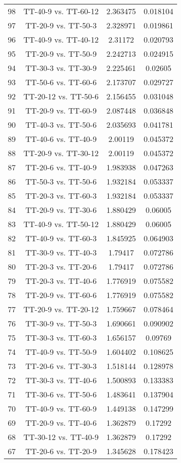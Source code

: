 \documentclass[a4paper,10pt]{article}
\begin{document}
\begin{landscape}
\begin{table}[!htp]
\begin{tabular}{cccc}
98&TT-40-9 vs. TT-60-12&2.363475&0.018104\\
97&TT-20-9 vs. TT-50-3&2.328971&0.019861\\
96&TT-40-9 vs. TT-40-12&2.31172&0.020793\\
95&TT-20-9 vs. TT-50-9&2.242713&0.024915\\
94&TT-30-3 vs. TT-30-9&2.225461&0.02605\\
93&TT-50-6 vs. TT-60-6&2.173707&0.029727\\
92&TT-20-12 vs. TT-50-6&2.156455&0.031048\\
91&TT-20-9 vs. TT-60-9&2.087448&0.036848\\
90&TT-40-3 vs. TT-50-6&2.035693&0.041781\\
89&TT-40-6 vs. TT-40-9&2.00119&0.045372\\
88&TT-20-9 vs. TT-30-12&2.00119&0.045372\\
87&TT-20-6 vs. TT-40-9&1.983938&0.047263\\
86&TT-50-3 vs. TT-50-6&1.932184&0.053337\\
85&TT-20-3 vs. TT-60-3&1.932184&0.053337\\
84&TT-20-9 vs. TT-30-6&1.880429&0.06005\\
83&TT-40-9 vs. TT-50-12&1.880429&0.06005\\
82&TT-40-9 vs. TT-60-3&1.845925&0.064903\\
81&TT-30-9 vs. TT-40-3&1.79417&0.072786\\
80&TT-20-3 vs. TT-20-6&1.79417&0.072786\\
79&TT-20-3 vs. TT-40-6&1.776919&0.075582\\
78&TT-20-9 vs. TT-60-6&1.776919&0.075582\\
77&TT-20-9 vs. TT-20-12&1.759667&0.078464\\
76&TT-30-9 vs. TT-50-3&1.690661&0.090902\\
75&TT-30-3 vs. TT-60-3&1.656157&0.09769\\
74&TT-40-9 vs. TT-50-9&1.604402&0.108625\\
73&TT-20-6 vs. TT-30-3&1.518144&0.128978\\
72&TT-30-3 vs. TT-40-6&1.500893&0.133383\\
71&TT-30-6 vs. TT-50-6&1.483641&0.137904\\
70&TT-40-9 vs. TT-60-9&1.449138&0.147299\\
69&TT-20-9 vs. TT-40-6&1.362879&0.17292\\
68&TT-30-12 vs. TT-40-9&1.362879&0.17292\\
67&TT-20-6 vs. TT-20-9&1.345628&0.178423\\

\end{tabular}
\end{table}
\end{landscape}
\end{document}
